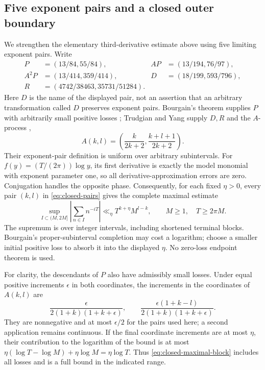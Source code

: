 \documentclass[11pt]{article}
\numberwithin{equation}{section}
\theoremstyle{definition}
\theoremstyle{remark}
\begin{document}
\subsection{Five exponent pairs and a closed outer boundary}
We strengthen the elementary third-derivative estimate above using five
limiting exponent pairs. Write
\begin{equation}
 \begin{aligned}
 P&=(13/84,55/84),& AP&=(13/194,76/97),\\
 A^2P&=(13/414,359/414),& D&=(18/199,593/796),\\
 R&=(4742/38463,35731/51284).
 \end{aligned}
 \label{eq:closed-pairs}
\end{equation}
Here $D$ is the name of the displayed pair, not an assertion that an
arbitrary transformation called $D$ preserves exponent pairs.
Bourgain's theorem supplies $P$ with arbitrarily small positive losses
\cite[Theorem 6]{bourgain14}; Trudgian and Yang supply $D,R$ and the
$A$-process
\cite[Section 1.1, Lemma 1.1, and eq.~(1.10)]{trudgianyang23},
\[
 A(k,l)=\left(\frac{k}{2k+2},\frac{k+l+1}{2k+2}\right).
\]
Their exponent-pair definition is uniform over arbitrary subintervals.
For $f(y)=(T/(2\pi))\log y$, its first derivative is exactly the model
monomial with exponent parameter one, so all derivative-approximation
errors are zero. Conjugation handles the opposite phase. Consequently,
for each fixed $\eta>0$, every pair $(k,l)$ in
\eqref{eq:closed-pairs} gives the complete maximal estimate
\begin{equation}
 \sup_{I\subset(M,2M]}
 \left|\sum_{n\in I}n^{-iT}\right|
 \ll_\eta T^{k+\eta}M^{l-k},
 \qquad M\ge1,\quad T\ge2\pi M.
 \label{eq:closed-maximal-block}
\end{equation}
The supremum is over integer intervals, including shortened terminal
blocks. Bourgain's proper-subinterval completion may cost a logarithm;
choose a smaller initial positive loss to absorb it into the displayed
$\eta$. No zero-loss endpoint theorem is used.

For clarity, the descendants of $P$ also have admissibly small losses.
Under equal positive increments $\epsilon$ in both coordinates, the
increments in the coordinates of $A(k,l)$ are
\[
 \frac{\epsilon}{2(1+k)(1+k+\epsilon)},\qquad
 \frac{\epsilon(1+k-l)}{2(1+k)(1+k+\epsilon)}.
\]
They are nonnegative and at most $\epsilon/2$ for the pairs used here;
a second application remains continuous. If the final coordinate
increments are at most $\eta$, their contribution to the logarithm of
the bound is at most
$\eta(\log T-\log M)+\eta\log M=\eta\log T$.
Thus \eqref{eq:closed-maximal-block} includes all losses and is a full
bound in the indicated range.
\end{document}
